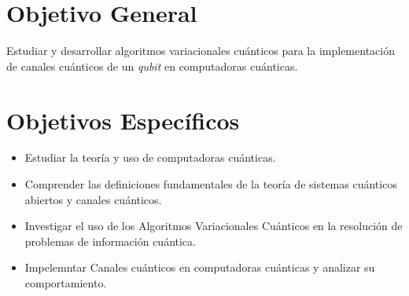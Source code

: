 \documentclass[11pt, spanish, letterpage]{report} %
\newcommand{\1}{\mathbb{1}}
\newcounter{problem}[section]
\begin{document}
\begin{titlepage}
\vfill\vfill\vfill %
\vfill\vfill\vfill




\vfill %

\end{titlepage} %
\section{Objetivo General} %
Estudiar  y desarrollar algoritmos variacionales cuánticos para la implementación de canales cuánticos de un \textit{qubit} en computadoras cuánticas.
\section{Objetivos Específicos} %

\begin{itemize}
\item Estudiar la teoría y uso de computadoras cuánticas.


    \item Comprender las definiciones fundamentales de la teoría de sistemas cuánticos abiertos y canales cuánticos.
    
    \item Investigar el uso de los Algoritmos Variacionales Cuánticos en la resolución de problemas de información cuántica.

    \item Impelemntar Canales cuánticos en computadoras cuánticas y analizar su comportamiento.
\end{itemize}
\end{document}
